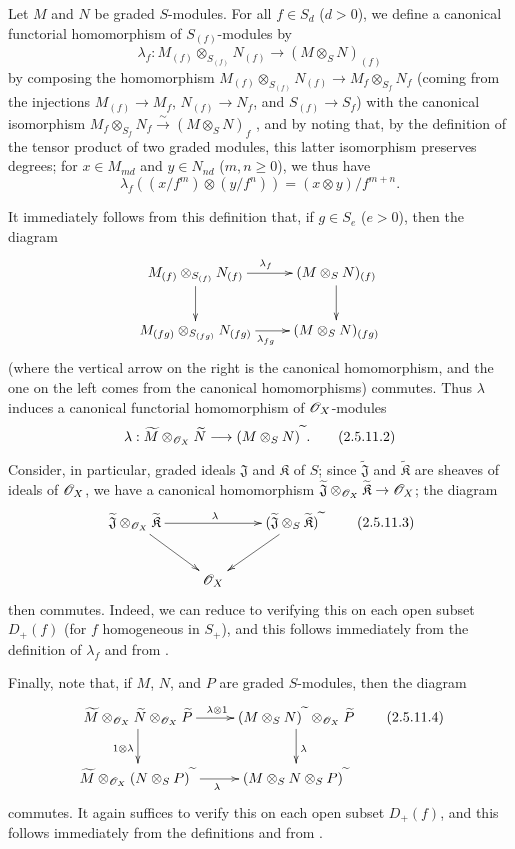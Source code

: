 \begin{env}[2.5.11]
\label{II.2.5.11}
Let $M$ and $N$ be graded $S$-modules.
For all $f\in S_d$ ($d>0$), we define a canonical functorial homomorphism of $S_{(f)}$-modules by
\[
\label{II.2.5.11.1}
  \lambda_f: M_{(f)}\otimes_{S_{(f)}}N_{(f)} \to (M\otimes_S N)_{(f)}
\tag{2.5.11.1}
\]
by composing the homomorphism $M_{(f)}\otimes_{S_{(f)}}N_{(f)}\to M_f\otimes_{S_f}N_f$ (coming from the injections $M_{(f)}\to M_f$, $N_{(f)}\to N_f$, and $S_{(f)}\to S_f$) with the canonical isomorphism $M_f\otimes_{S_f}N_f\xrightarrow{\sim}(M\otimes_S N)_f$ , and by noting that, by the definition of the tensor product of two graded modules, this latter isomorphism preserves degrees;
for $x\in M_{md}$ and $y\in N_{nd}$ ($m,n\geq0$), we thus have
\[
  \lambda_f((x/f^m)\otimes(y/f^n)) = (x\otimes y)/f^{m+n}.
\]

It immediately follows from this definition that, if $g\in S_e$ ($e>0$), then the diagram
\[
  \xymatrix{
    M_{(f)}\otimes_{S_{(f)}}N_{(f)} \ar[r]^{\lambda_f} \ar[d]
    & (M\otimes_S N)_{(f)} \ar[d]
  \\M_{(fg)}\otimes_{S_{(fg)}}N_{(fg)} \ar[r]_{\lambda_{fg}}
    & (M\otimes_S N)_{(fg)}
  }
\]
(where the vertical arrow on the right is the canonical homomorphism, and the one on the left comes from the canonical homomorphisms) commutes.
Thus $\lambda$ induces a canonical functorial homomorphism of $\mathscr{O}_X$-modules
\[
\label{II.2.5.11.2}
  \lambda: \widetilde{M}\otimes_{\sh{O}_X}\widetilde{N} \to (M\otimes_S N)^\supertilde.
\tag{2.5.11.2}
\]

Consider, in particular, graded ideals $\mathfrak{J}$ and $\mathfrak{K}$ of $S$;
since $\widetilde{\mathfrak{J}}$ and $\widetilde{\mathfrak{K}}$ are sheaves of ideals of $\mathscr{O}_X$, we have a canonical homomorphism $\widetilde{\mathfrak{J}}\otimes_{\sh{O}_X}\widetilde{\mathfrak{K}}\to\sh{O}_X$;
the diagram
\[
\label{II.2.5.11.3}
  \xymatrix{
    \widetilde{\mathfrak{J}}\otimes_{\sh{O}_X}\widetilde{\mathfrak{K}} \ar[rr]^\lambda \ar[dr]
    && (\widetilde{\mathfrak{J}}\otimes_S\widetilde{\mathfrak{K}})^\supertilde \ar[dl]
  \\&\sh{O}_X&
  }
\tag{2.5.11.3}
\]
then commutes.
Indeed, we can reduce to verifying this on each open subset $D_+(f)$ (for $f$ homogeneous in $S_+$), and this follows immediately from the definition  of $\lambda_f$ and from .

Finally, note that, if $M$, $N$, and $P$ are graded $S$-modules, then the diagram
\[
\label{II.2.5.11.4}
  \xymatrix{
    \widetilde{M}\otimes_{\sh{O}_X}\widetilde{N}\otimes_{\sh{O}_X}\widetilde{P} \ar[r]^{\lambda\otimes1} \ar[d]_{1\otimes\lambda}
    & (M\otimes_S N)^\supertilde\otimes_{\sh{O}_X}\widetilde{P} \ar[d]^\lambda
  \\\widetilde{M}\otimes_{\sh{O}_X}(N\otimes_S P)^\supertilde \ar[r]_\lambda
    & (M\otimes_S N\otimes_S P)^\supertilde
  }
\tag{2.5.11.4}
\]
commutes.
It again suffices to verify this on each open subset $D_+(f)$, and this follows immediately from the definitions and from .
\end{env}

